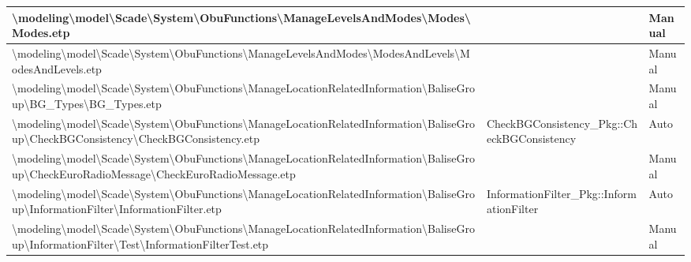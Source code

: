 \begin{longtable}{|>{\RaggedRight}p{}|>{\RaggedRight}p{}|>{\RaggedRight}p{}|}
\hline
\textbackslash modeling\textbackslash \allowbreak model\textbackslash \allowbreak Scade\textbackslash \allowbreak System\textbackslash \allowbreak ObuFunctions\textbackslash \allowbreak ManageLevelsAndModes\textbackslash \allowbreak Modes\textbackslash \allowbreak Modes.etp& &Manual\\
\hline
\textbackslash modeling\textbackslash \allowbreak model\textbackslash \allowbreak Scade\textbackslash \allowbreak System\textbackslash \allowbreak ObuFunctions\textbackslash \allowbreak ManageLevelsAndModes\textbackslash \allowbreak ModesAndLevels\textbackslash \allowbreak ModesAndLevels.etp& &Manual\\
\hline
\textbackslash modeling\textbackslash \allowbreak model\textbackslash \allowbreak Scade\textbackslash \allowbreak System\textbackslash \allowbreak ObuFunctions\textbackslash \allowbreak ManageLocationRelatedInformation\textbackslash \allowbreak BaliseGroup\textbackslash \allowbreak BG\_\allowbreak Types\textbackslash \allowbreak BG\_\allowbreak Types.etp& &Manual\\
\hline
\textbackslash modeling\textbackslash \allowbreak model\textbackslash \allowbreak Scade\textbackslash \allowbreak System\textbackslash \allowbreak ObuFunctions\textbackslash \allowbreak ManageLocationRelatedInformation\textbackslash \allowbreak BaliseGroup\textbackslash \allowbreak CheckBGConsistency\textbackslash \allowbreak CheckBGConsistency.etp&CheckBGConsistency\_\allowbreak Pkg::CheckBGConsistency&Auto\\
\hline
\textbackslash modeling\textbackslash \allowbreak model\textbackslash \allowbreak Scade\textbackslash \allowbreak System\textbackslash \allowbreak ObuFunctions\textbackslash \allowbreak ManageLocationRelatedInformation\textbackslash \allowbreak BaliseGroup\textbackslash \allowbreak CheckEuroRadioMessage\textbackslash \allowbreak CheckEuroRadioMessage.etp& &Manual\\
\hline
\textbackslash modeling\textbackslash \allowbreak model\textbackslash \allowbreak Scade\textbackslash \allowbreak System\textbackslash \allowbreak ObuFunctions\textbackslash \allowbreak ManageLocationRelatedInformation\textbackslash \allowbreak BaliseGroup\textbackslash \allowbreak InformationFilter\textbackslash \allowbreak InformationFilter.etp&InformationFilter\_\allowbreak Pkg::InformationFilter&Auto\\
\hline
\textbackslash modeling\textbackslash \allowbreak model\textbackslash \allowbreak Scade\textbackslash \allowbreak System\textbackslash \allowbreak ObuFunctions\textbackslash \allowbreak ManageLocationRelatedInformation\textbackslash \allowbreak BaliseGroup\textbackslash \allowbreak InformationFilter\textbackslash \allowbreak Test\textbackslash \allowbreak InformationFilterTest.etp& &Manual\\

\end{longtable}
